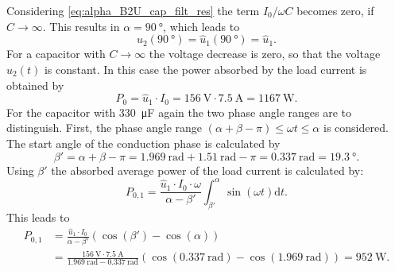 \begin{solutionblock}
    Considering \eqref{eq:alpha_B2U_cap_filt_res} the term $I_\mathrm{0}/{\omega C}$ becomes zero, if $C\rightarrow \infty$. 
    This results in $\alpha=\SI{90}{\degree}$, which leads to
    \begin{equation} 
        u_\mathrm{2}(\SI{90}{\degree})=\hat{u}_\mathrm{1}(\SI{90}{\degree})=\hat{u}_\mathrm{1}.
    \end{equation}
    For a capacitor with $C\rightarrow \infty$ the voltage decrease is zero, so that the voltage $u_\mathrm{2}(t)$ is constant.
    In this case the power absorbed by the load current is obtained by
    \begin{equation} 
        P_\mathrm{0}=\hat{u}_\mathrm{1} \cdot I_{\mathrm{0}}=\SI{156}{\volt}\cdot\SI{7.5}{\ampere}=\SI{1167}{\watt}.
    \end{equation}
    For the capacitor with \SI{330}{\micro\farad} again the two phase angle ranges are to distinguish. First, the phase angle range
    $(\alpha+\beta-\pi)\leq\omega t\leq\alpha$ is considered. The start angle of the conduction phase is calculated by
    \begin{equation} 
        \beta'=\alpha+\beta-\pi=\SI{1.969}{\radian}+\SI{1.51}{\radian}-\pi
        =\SI{0.337}{\radian} = \SI{19.3}{\degree}.
    \end{equation}
    Using $\beta'$ the absorbed average power of the load current is calculated by:
    \begin{equation} 
        P_\mathrm{0,1}=\frac{\hat{u}_\mathrm{1} \cdot I_{\mathrm{0}} \cdot \omega}{\alpha-\beta'} \int_{\beta'}^{\alpha} \sin(\omega t)\mathrm{d}t.
    \end{equation}
    This leads to
    \begin{equation} 
        \begin{aligned}
            P_\mathrm{0,1}&=\frac{\hat{u}_\mathrm{1} \cdot I_{\mathrm{0}}}{\alpha-\beta'} \left( \cos(\beta') - \cos(\alpha) \right) \\
            &=\frac{\SI{156}{\volt} \cdot \SI{7.5}{\ampere}}{\SI{1.969}{\radian}-\SI{0.337}{\radian}}
             \left( \cos(\SI{0.337}{\radian}) - \cos(\SI{1.969}{\radian}) \right)=\SI{952}{\watt}.
        \end{aligned}
    \end{equation}

\end{solutionblock}
